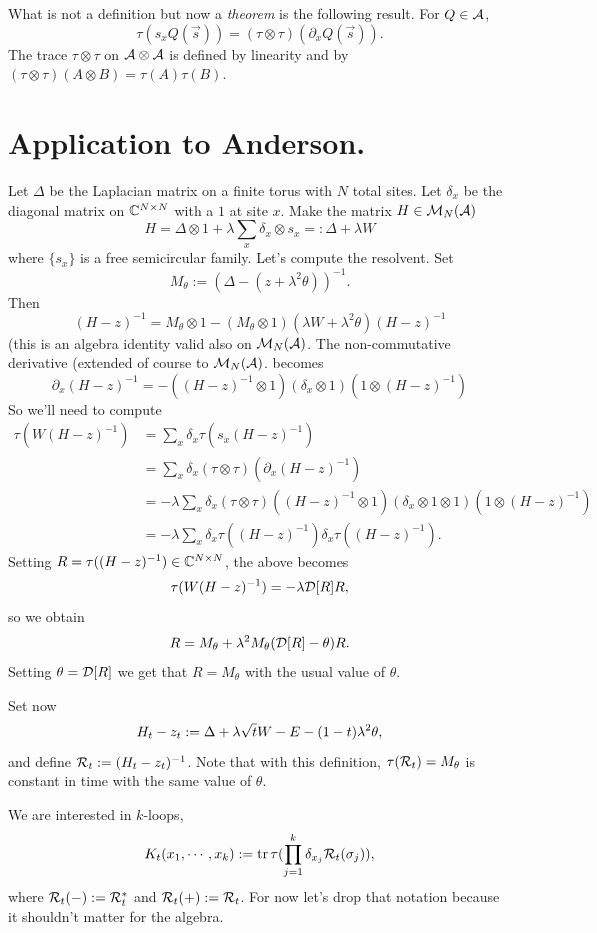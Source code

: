 \documentclass[11pt]{amsart}
\begin{document}
What is not a definition but now a \textit{theorem} is the following result.
For $Q\in{\mathcal{A}}$,
\[
\tau(s_x Q(\vec{s})) = (\tau\otimes \tau)(\partial_x Q(\vec{s})).
\]
The trace $\tau\otimes \tau$ on ${\mathcal{A}}\otimes {\mathcal{A}}$ is defined by linearity
and by $(\tau\otimes \tau)(A\otimes B) = \tau(A)\tau(B)$.

\section{Application to Anderson.}
Let $\Delta$ be the Laplacian matrix on a finite torus with $N$ total sites.
Let $\delta_x$ be the diagonal matrix on ${\mathbb C}^{N\times N}$ with a $1$ at site $x$.
Make the matrix $H\in{\mathcal{M}}_N({\mathcal{A}})$
\[
H = \Delta \otimes 1 + \lambda \sum_x \delta_x \otimes s_x =: \Delta + \lambda W
\]
where $\{s_x\}$ is a free semicircular family.
Let's compute the resolvent.  Set
\[
M_\theta := (\Delta - (z+\lambda^2\theta))^{-1}.
\]
Then
\[
(H-z)^{-1} = M_\theta\otimes 1 - (M_\theta\otimes 1)
(\lambda W + \lambda^2\theta) (H-z)^{-1}
\]
(this is an algebra identity valid also on ${\mathcal{M}}_N({\mathcal{A}})$.
The non-commutative derivative (extended of course to ${\mathcal{M}}_N({\mathcal{A}})$.
becomes
\[
\partial_x (H-z)^{-1} = -((H-z)^{-1}\otimes 1) (\delta_x\otimes 1) (1 \otimes (H-z)^{-1})
\]
So we'll need to compute
\begin{align*}
\tau(W (H-z)^{-1})
&= \sum_x \delta_x \tau(s_x (H-z)^{-1}) \\
&= \sum_x \delta_x (\tau\otimes\tau)(\partial_x (H-z)^{-1}) \\
&= -\lambda \sum_x \delta_x
(\tau\otimes\tau)((H-z)^{-1}\otimes 1) (\delta_x\otimes 1\otimes 1) (1\otimes  (H-z)^{-1}) \\
&= -\lambda \sum_x \delta_x
\tau((H-z)^{-1})\delta_x \tau((H-z)^{-1}).
\end{align*}
Setting $R = \tau((H-z)^{-1}) \in {\mathbb C}^{N\times N}$, the
above becomes
\[
\tau(W(H-z)^{-1}) = -\lambda {\mathcal{D}}[R] R,
\]
so we obtain
\[
R = M_\theta + \lambda^2 M_\theta ({\mathcal{D}}[R]-\theta) R.
\]
Setting $\theta = {\mathcal{D}}[R]$ we get that $R=M_\theta$ with the usual value of $\theta$.

Set now
\[
H_t-z_t := \Delta + \lambda \sqrt{t} W - E - (1-t)\lambda^2\theta,
\]
and define ${\mathcal{R}}_t := (H_t-z_t)^{-1}$.
Note that with this definition, $\tau({\mathcal{R}}_t) = M_\theta$ is constant in time
with the same value of $\theta$.

We are interested in $k$-loops,
\[
K_t(x_1,\cdots,x_k) := \operatorname{tr} \tau(\prod_{j=1}^k \delta_{x_j} {\mathcal{R}}_t(\sigma_j)),
\]
where ${\mathcal{R}}_t(-) := {\mathcal{R}}_t^*$ and ${\mathcal{R}}_t(+) := {\mathcal{R}}_t$.  For
now let's drop that notation because it shouldn't matter for the algebra.
\end{document}
